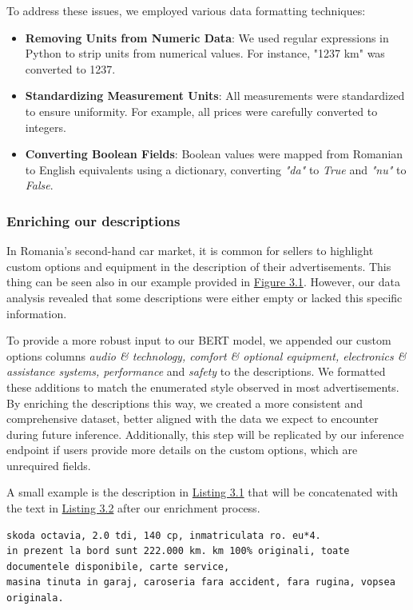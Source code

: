 To address these issues, we employed various data formatting techniques:
\begin{itemize}
    \item \textbf{Removing Units from Numeric Data}: We used regular expressions in Python to strip units from numerical values. For instance, "1237 km" was converted to 1237.
    \item \textbf{Standardizing Measurement Units}: All measurements were standardized to ensure uniformity. For example, all prices were carefully converted to integers.
    \item \textbf{Converting Boolean Fields}: Boolean values were mapped from Romanian to English equivalents using a dictionary, converting \textit{"da"} to \textit{True} and \textit{"nu"} to \textit{False}.
\end{itemize}

\subsubsection{Enriching our descriptions}
In Romania's second-hand car market, it is common for sellers to highlight custom options and equipment in the description of their advertisements. This thing can be seen also in our example provided in \hyperref[fig:scraping-details]{Figure 3.1}. However, our data analysis revealed that some descriptions were either empty or lacked this specific information. 

To provide a more robust input to our BERT model, we appended our custom options columns \textit{audio \& technology, comfort \& optional equipment, electronics \& assistance systems, performance} and \textit{safety} to the descriptions. We formatted these additions to match the enumerated style observed in most advertisements. By enriching the descriptions this way, we created a more consistent and comprehensive dataset, better aligned with the data we expect to encounter during future inference. Additionally, this step will be replicated by our inference endpoint if users provide more details on the custom options, which are unrequired fields.

A small example is the description in \hyperref[lst:description-before]{Listing 3.1} that will be concatenated with the text in \hyperref[lst:description-after]{Listing 3.2} after our enrichment process.

\begin{lstlisting}[caption={Raw Description}, label={lst:description-before}, language={}]
skoda octavia, 2.0 tdi, 140 cp, inmatriculata ro. eu*4.
in prezent la bord sunt 222.000 km. km 100% originali, toate documentele disponibile, carte service,
masina tinuta in garaj, caroseria fara accident, fara rugina, vopsea originala.
\end{lstlisting}

